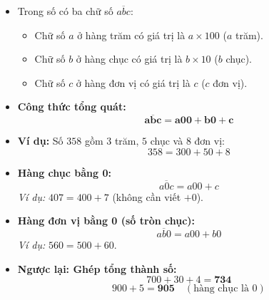 \documentclass[10pt,a4paper]{article}
\begin{document}
\noindent
\begin{minipage}[t]{0.49\textwidth}\vspace{0pt}
\begin{tcolorbox}[
  enhanced,
  colback=violet!4!white,
  colframe=violet!75!black,
  arc=2mm, boxrule=0.8pt,
  left=2mm, right=2mm, top=1.8mm, bottom=1.8mm,
  title={\footnotesize\bfseries\color{white}\faKey\ 1. Giá trị theo vị trí của từng chữ số}
]
{\footnotesize
\begin{itemize}\setlength{\itemsep}{1pt}\setlength{\leftskip}{-2.5mm}
  \item Trong số có ba chữ số $\overline{abc}$:
  \begin{itemize}\setlength{\itemsep}{0.5pt}\setlength{\leftskip}{-2mm}
    \item Chữ số $a$ ở hàng trăm có giá trị là $a \times 100$ ($a$ trăm).
    \item Chữ số $b$ ở hàng chục có giá trị là $b \times 10$ ($b$ chục).
    \item Chữ số $c$ ở hàng đơn vị có giá trị là $c$ ($c$ đơn vị).
  \end{itemize}
  \item \textbf{Công thức tổng quát:}
  $$\mathbf{\overline{abc} = a00 + b0 + c}$$
  \item \textbf{Ví dụ:} Số $358$ gồm $3$ trăm, $5$ chục và $8$ đơn vị:
  $$358 = 300 + 50 + 8$$
\end{itemize}
}
\end{tcolorbox}
\end{minipage}
\hfill
\begin{minipage}[t]{0.49\textwidth}\vspace{0pt}
\begin{tcolorbox}[
  enhanced,
  colback=teal!4!white,
  colframe=teal!75!black,
  arc=2mm, boxrule=0.8pt,
  left=2mm, right=2mm, top=1.8mm, bottom=1.8mm,
  title={\footnotesize\bfseries\color{white}\faSliders\ 2. Các trường hợp có chữ số 0}
]
{\footnotesize
\begin{itemize}\setlength{\itemsep}{1pt}\setlength{\leftskip}{-2.5mm}
  \item \textbf{Hàng chục bằng 0:}
  $$\overline{a0c} = a00 + c$$
  \textit{Ví dụ:} $407 = 400 + 7$ (không cần viết $+ 0$).
  \item \textbf{Hàng đơn vị bằng 0 (số tròn chục):}
  $$\overline{ab0} = a00 + b0$$
  \textit{Ví dụ:} $560 = 500 + 60$.
  \item \textbf{Ngược lại: Ghép tổng thành số:}
  $$700 + 30 + 4 = \mathbf{734}$$
  $$900 + 5 = \mathbf{905}\quad (\text{hàng chục là } 0)$$
\end{itemize}
}
\end{tcolorbox}
\end{minipage}
\end{document}
